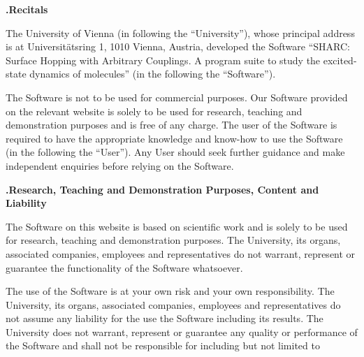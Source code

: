 \documentclass[a4paper,11pt,DIV=15,openany,twoside=false]{scrbook}
\begin{document}
\newcommand{\licensepara}[1]{\vspace{\bigskipamount}\addtocounter{licenseparacount}{1}\textbf{\thelicenseparacount.\quad#1}\newline}
{
\begin{shaded}
\licensepara{Recitals}

The University of Vienna (in following the ``University''), whose principal address is at Universit\"ats\-ring 1, 1010 Vienna, Austria, developed the Software ``SHARC: Surface Hopping with Arbitrary Couplings. A program suite to study the excited-state dynamics of molecules'' (in the following the ``Software'').

The Software is not to be used for commercial purposes. Our Software provided on the relevant website is solely to be used for research, teaching and demonstration purposes and is free of any charge. The user of the Software is required to have the appropriate knowledge and know-how to use the Software (in the following the ``User''). Any User should seek further guidance and make independent enquiries before relying on the Software.

\licensepara{Research, Teaching and Demonstration Purposes, Content and Liability}

The Software on this website is based on scientific work and is solely to be used for research, teaching and demonstration purposes. The University, its organs, associated companies, employees and representatives do not warrant, represent or guarantee the functionality of the Software whatsoever. 

The use of the Software is at your own risk and your own responsibility. The University, its organs, associated companies, employees and representatives do not assume any liability for the use the Software including its results. The University does not warrant, represent or guarantee any quality or performance of the Software and shall not be responsible for including but not limited to


\end{shaded}}
\end{document}
